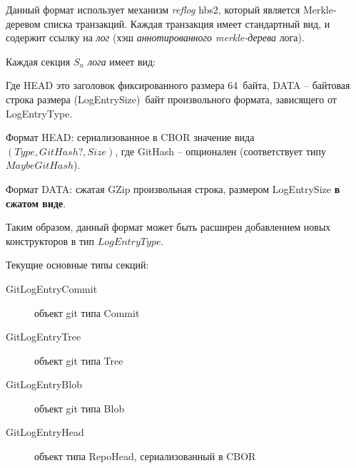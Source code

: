 \documentclass[11pt,a4paper]{article}
\newcommand{\term}[2]{\textit{#2}}
\begin{document}
Данный формат использует механизм \term{reflog}{reflog} hbs2, который является Merkle-деревом
списка транзакций. Каждая транзакция имеет стандартный вид, и содержит ссылку на
\term{log}{лог} (хэш \term{ann-merkle-tree}{аннотированного merkle-дерева} лога).

Каждая секция $S_n$ \term{log}{лога} имеет вид:

\begin{figure}[h!]
\centering
\end{figure}

Где HEAD это заголовок фиксированного размера 64~байта, DATA -- байтовая строка размера (LogEntrySize)~байт
произвольного формата, зависящего от LogEntryType.

Формат HEAD:  сериализованное в CBOR значение вида $(Type, GitHash?, Size)$, где GitHash --
опционален (соответствует типу $Maybe GitHash$).

Формат DATA: сжатая GZip произвольная строка, размером LogEntrySize \textbf{в сжатом виде}.

Таким образом, данный формат может быть расширен добавлением новых конструкторов в тип
$LogEntryType$.

Текущие основные типы секций:

\begin{description}
 \item[GitLogEntryCommit] объект git типа Commit
 \item[GitLogEntryTree]   объект git типа Tree
 \item[GitLogEntryBlob]   объект git типа Blob
 \item[GitLogEntryHead]   объект типа RepoHead, сериализованный в CBOR
\end{description}
\end{document}
